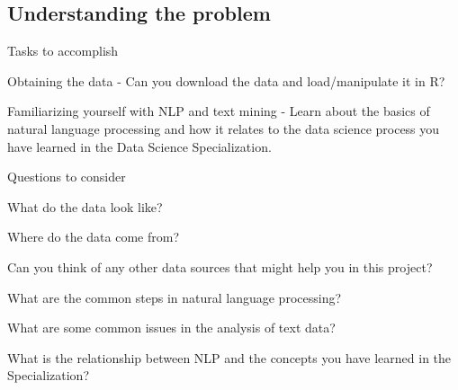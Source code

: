 \documentclass{article}
\begin{document}



\subsection{Understanding the problem}

Tasks to accomplish

Obtaining the data - Can you download the data and load/manipulate it in R?

Familiarizing yourself with NLP and text mining - Learn about the basics of natural language processing and how it relates to the data science process you have learned in the Data Science Specialization.



Questions to consider

What do the data look like?

Where do the data come from?

Can you think of any other data sources that might help you in this project?

What are the common steps in natural language processing?

What are some common issues in the analysis of text data?

What is the relationship between NLP and the concepts you have learned in the Specialization?
\end{document}
